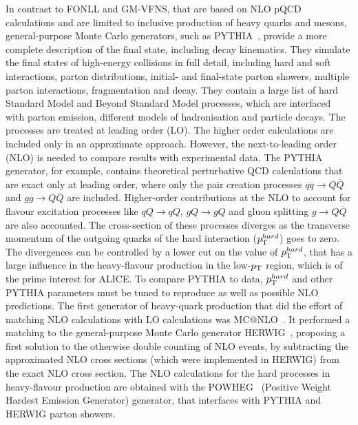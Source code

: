 In contrast to FONLL and GM-VFNS, that are based on NLO 
pQCD calculations and are limited to inclusive production
of heavy quarks and mesons, general-purpose Monte Carlo 
generators, such as PYTHIA~\cite{Sjostrand:2006za}, provide a more complete description 
of the final state, including decay kinematics. They simulate the 
final states of high-energy collisions in full detail, including hard and 
soft interactions, parton distributions, initial- and final-state parton 
showers, multiple parton interactions, fragmentation and decay. They contain a large 
list of hard Standard Model and Beyond Standard Model processes, 
which are interfaced with parton emission, different models of hadronisation and particle decays. 
The processes are treated at leading order (LO). The higher order 
calculations are included only in an
approximate approach. However, the next-to-leading order (NLO) 
is needed to compare results with experimental data.
The PYTHIA generator, for example, contains 
theoretical perturbative QCD calculations that are exact only
at leading order, where only the pair creation processes 
$q\overline{q} \rightarrow Q\overline{Q}$ and $gg \rightarrow Q\overline{Q}$
are included. Higher-order contributions at the NLO to account 
for flavour excitation processes like $qQ \rightarrow qQ$, $gQ \rightarrow gQ$
and gluon splitting $g \rightarrow Q\overline{Q}$ are also accounted. 
The cross-section of these processes 
diverges as the transverse momentum of the outgoing quarks of the 
hard interaction ($p_{\rm T}^{hard}$) goes to zero. 
The divergences can be controlled by a lower cut 
on the value of  $p_{\rm T}^{hard}$, that has a large influence in the 
heavy-flavour production 
in the low-$p_{\rm T}$ region, which is of the prime interest for ALICE. 
To compare PYTHIA to data, $p_{\rm T}^{hard}$ and
other PYTHIA parameters must be tuned to reproduce as well 
as possible NLO predictions.
The first generator of heavy-quark production that did the effort of matching NLO calculations 
with LO calculations was MC@NLO~\cite{Frixione:2002ik}.
It performed a matching to the general-purpose Monte Carlo generator HERWIG~\cite{Corcella:2000bw}, proposing 
a first solution to the otherwise double counting of NLO events, 
by subtracting the approximated NLO cross sections (which were implemented in HERWIG) from the exact NLO cross section.
The NLO calculations for the hard processes in heavy-flavour production are obtained with the 
POWHEG~\cite{Frixione:2007nw} (Positive Weight Hardest Emission Generator) generator,
that interfaces with PYTHIA and HERWIG parton showers. 

